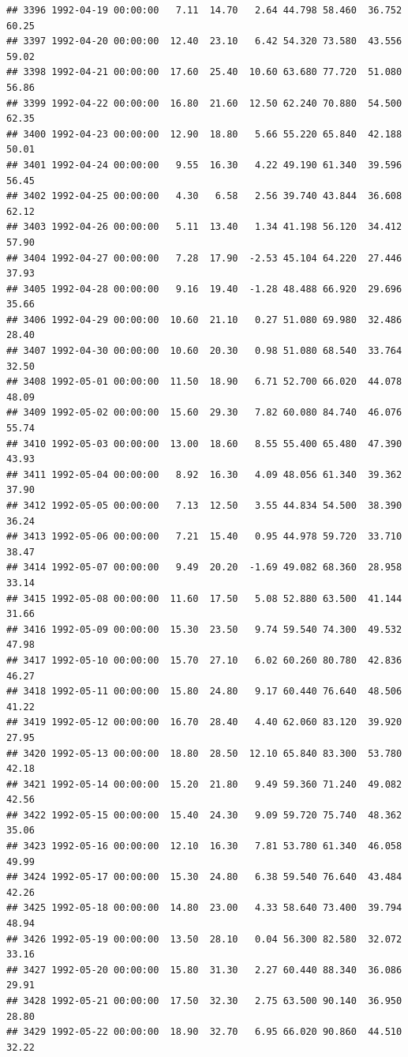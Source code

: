 \documentclass{article}\usepackage{graphicx, color}
\makeatletter
\newenvironment{kframe}{%
 \def\at@end@of@kframe{}%
 \ifinner\ifhmode%
  \def\at@end@of@kframe{\end{minipage}}%
  \begin{minipage}{\columnwidth}%
 \fi\fi%
 \def\FrameCommand##1{\hskip\@totalleftmargin \hskip-\fboxsep
 \colorbox{shadecolor}{##1}\hskip-\fboxsep
     \hskip-\linewidth \hskip-\@totalleftmargin \hskip\columnwidth}%
 \MakeFramed {\advance\hsize-\width
   \@totalleftmargin\z@ \linewidth\hsize
   \@setminipage}}%
 {\par\unskip\endMakeFramed%
 \at@end@of@kframe}
\newenvironment{knitrout}{}{} %
\makeatother
\begin{document}
\begin{knitrout}
\begin{kframe}
\begin{verbatim}
## 3396 1992-04-19 00:00:00   7.11  14.70   2.64 44.798 58.460  36.752  60.25
## 3397 1992-04-20 00:00:00  12.40  23.10   6.42 54.320 73.580  43.556  59.02
## 3398 1992-04-21 00:00:00  17.60  25.40  10.60 63.680 77.720  51.080  56.86
## 3399 1992-04-22 00:00:00  16.80  21.60  12.50 62.240 70.880  54.500  62.35
## 3400 1992-04-23 00:00:00  12.90  18.80   5.66 55.220 65.840  42.188  50.01
## 3401 1992-04-24 00:00:00   9.55  16.30   4.22 49.190 61.340  39.596  56.45
## 3402 1992-04-25 00:00:00   4.30   6.58   2.56 39.740 43.844  36.608  62.12
## 3403 1992-04-26 00:00:00   5.11  13.40   1.34 41.198 56.120  34.412  57.90
## 3404 1992-04-27 00:00:00   7.28  17.90  -2.53 45.104 64.220  27.446  37.93
## 3405 1992-04-28 00:00:00   9.16  19.40  -1.28 48.488 66.920  29.696  35.66
## 3406 1992-04-29 00:00:00  10.60  21.10   0.27 51.080 69.980  32.486  28.40
## 3407 1992-04-30 00:00:00  10.60  20.30   0.98 51.080 68.540  33.764  32.50
## 3408 1992-05-01 00:00:00  11.50  18.90   6.71 52.700 66.020  44.078  48.09
## 3409 1992-05-02 00:00:00  15.60  29.30   7.82 60.080 84.740  46.076  55.74
## 3410 1992-05-03 00:00:00  13.00  18.60   8.55 55.400 65.480  47.390  43.93
## 3411 1992-05-04 00:00:00   8.92  16.30   4.09 48.056 61.340  39.362  37.90
## 3412 1992-05-05 00:00:00   7.13  12.50   3.55 44.834 54.500  38.390  36.24
## 3413 1992-05-06 00:00:00   7.21  15.40   0.95 44.978 59.720  33.710  38.47
## 3414 1992-05-07 00:00:00   9.49  20.20  -1.69 49.082 68.360  28.958  33.14
## 3415 1992-05-08 00:00:00  11.60  17.50   5.08 52.880 63.500  41.144  31.66
## 3416 1992-05-09 00:00:00  15.30  23.50   9.74 59.540 74.300  49.532  47.98
## 3417 1992-05-10 00:00:00  15.70  27.10   6.02 60.260 80.780  42.836  46.27
## 3418 1992-05-11 00:00:00  15.80  24.80   9.17 60.440 76.640  48.506  41.22
## 3419 1992-05-12 00:00:00  16.70  28.40   4.40 62.060 83.120  39.920  27.95
## 3420 1992-05-13 00:00:00  18.80  28.50  12.10 65.840 83.300  53.780  42.18
## 3421 1992-05-14 00:00:00  15.20  21.80   9.49 59.360 71.240  49.082  42.56
## 3422 1992-05-15 00:00:00  15.40  24.30   9.09 59.720 75.740  48.362  35.06
## 3423 1992-05-16 00:00:00  12.10  16.30   7.81 53.780 61.340  46.058  49.99
## 3424 1992-05-17 00:00:00  15.30  24.80   6.38 59.540 76.640  43.484  42.26
## 3425 1992-05-18 00:00:00  14.80  23.00   4.33 58.640 73.400  39.794  48.94
## 3426 1992-05-19 00:00:00  13.50  28.10   0.04 56.300 82.580  32.072  33.16
## 3427 1992-05-20 00:00:00  15.80  31.30   2.27 60.440 88.340  36.086  29.91
## 3428 1992-05-21 00:00:00  17.50  32.30   2.75 63.500 90.140  36.950  28.80
## 3429 1992-05-22 00:00:00  18.90  32.70   6.95 66.020 90.860  44.510  32.22

\end{verbatim}
\end{kframe}
\end{knitrout}
\end{document}
